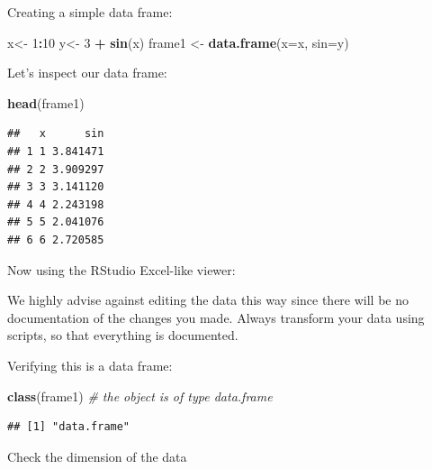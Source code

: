 \documentclass[]{book}
\newenvironment{Shaded}{\begin{snugshade}}{\end{snugshade}}
\newcommand{\KeywordTok}[1]{\textcolor[rgb]{0.13,0.29,0.53}{\textbf{#1}}}
\newcommand{\DataTypeTok}[1]{\textcolor[rgb]{0.13,0.29,0.53}{#1}}
\newcommand{\DecValTok}[1]{\textcolor[rgb]{0.00,0.00,0.81}{#1}}
\newcommand{\StringTok}[1]{\textcolor[rgb]{0.31,0.60,0.02}{#1}}
\newcommand{\CommentTok}[1]{\textcolor[rgb]{0.56,0.35,0.01}{\textit{#1}}}
\newcommand{\OperatorTok}[1]{\textcolor[rgb]{0.81,0.36,0.00}{\textbf{#1}}}
\newcommand{\NormalTok}[1]{#1}
\theoremstyle{definition}
\theoremstyle{definition}
\theoremstyle{definition}
\theoremstyle{remark}
\begin{document}
Creating a simple data frame:

\begin{Shaded}
\begin{Highlighting}[]
\NormalTok{x<-}\StringTok{ }\DecValTok{1}\OperatorTok{:}\DecValTok{10}
\NormalTok{y<-}\StringTok{ }\DecValTok{3} \OperatorTok{+}\StringTok{ }\KeywordTok{sin}\NormalTok{(x) }
\NormalTok{frame1 <-}\StringTok{ }\KeywordTok{data.frame}\NormalTok{(}\DataTypeTok{x=}\NormalTok{x, }\DataTypeTok{sin=}\NormalTok{y)    }
\end{Highlighting}
\end{Shaded}

Let's inspect our data frame:

\begin{Shaded}
\begin{Highlighting}[]
\KeywordTok{head}\NormalTok{(frame1)}
\end{Highlighting}
\end{Shaded}

\begin{verbatim}
##   x      sin
## 1 1 3.841471
## 2 2 3.909297
## 3 3 3.141120
## 4 4 2.243198
## 5 5 2.041076
## 6 6 2.720585
\end{verbatim}

Now using the RStudio Excel-like viewer:

\begin{Shaded}
\end{Shaded}

We highly advise against editing the data this way since there will be
no documentation of the changes you made. Always transform your data
using scripts, so that everything is documented.

Verifying this is a data frame:

\begin{Shaded}
\begin{Highlighting}[]
\KeywordTok{class}\NormalTok{(frame1) }\CommentTok{# the object is of type data.frame}
\end{Highlighting}
\end{Shaded}

\begin{verbatim}
## [1] "data.frame"
\end{verbatim}

Check the dimension of the data
\end{document}
